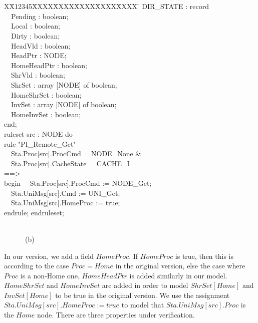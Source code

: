 \documentclass{llncs}
\newlength{\fminilength}
\newenvironment{fmini}[1][\linewidth]
  {\setlength{\fminilength}{#1\fboxsep-2\fboxrule}%
   \vspace{2ex}\noindent\begin{lrbox}{\fminibox}\begin{minipage}{\fminilength}%
   \mbox{ }\hfill\vspace{-2.5ex}}%
  {\end{minipage}\end{lrbox}\vspace{1ex}\hspace{0ex}%
   \framebox{\usebox{\fminibox}}}
\newenvironment{specification}
{\noindent\scriptsize
\tt\begin{fmini}\begin{tabbing}X\=X12345\=XXXX\=XXXX\=XXXX\=XXXX\=XXXX
\=\+\kill} {\end{tabbing}\normalfont\end{fmini}}
\def \twoSpaces {\ \ }
\def \twoSpaces {\ \ }
\begin{document}
\begin{multicols}{2}
\begin{specification}
  DIR\_STATE : record\\
\twoSpaces     Pending : boolean;\\
\twoSpaces     Local : boolean;\\
\twoSpaces     Dirty : boolean;\\
\twoSpaces     HeadVld : boolean;\\
\twoSpaces     HeadPtr : NODE;\\
\twoSpaces     HomeHeadPtr : boolean;\\
\twoSpaces     ShrVld : boolean;\\
\twoSpaces     ShrSet : array [NODE] of boolean;\\
\twoSpaces     HomeShrSet : boolean;\\
\twoSpaces     InvSet : array [NODE] of boolean;\\
\twoSpaces     HomeInvSet : boolean;\\
  end;\\

  ruleset src : NODE do\\
rule "PI\_Remote\_Get"\\
\twoSpaces   Sta.Proc[src].ProcCmd = NODE\_None \&\\
\twoSpaces   Sta.Proc[src].CacheState = CACHE\_I\\
==>\\
begin
\twoSpaces   Sta.Proc[src].ProcCmd := NODE\_Get;\\
\twoSpaces   Sta.UniMsg[src].Cmd := UNI\_Get;\\
\twoSpaces   Sta.UniMsg[src].HomeProc := true;\\
endrule; endruleset;\\
\end{specification}\\
\twoSpaces \twoSpaces \twoSpaces \center(b)
\end{multicols}





  In our version, we add a field $HomeProc$. If $HomeProc$ is true, then this is according to the case $Proc=Home$ in the original version, else     the case where $Proc$ is a non-Home one. $HomeHeadPtr$ is added similarly in our model.  $HomeShrSet$  and     $HomeInvSet$ are added in order to model $ShrSet[Home]$ and $InvSet[Home]$ to be true in the original version. We use the assignment $Sta.UniMsg[src].HomeProc := true$ to  model   that $Sta.UniMsg[src].Proc$ is the $Home$ node. There are three properties under verification.
\end{document}
